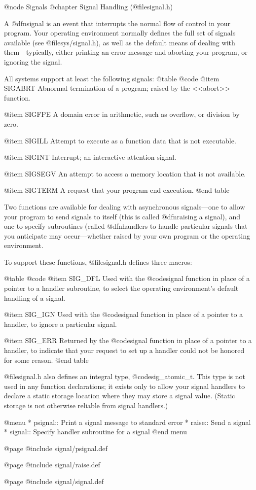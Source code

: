 @node Signals
@chapter Signal Handling (@file{signal.h})

A @dfn{signal} is an event that interrupts the normal flow of control
in your program.  Your operating environment normally defines the full
set of signals available (see @file{sys/signal.h}), as well as the
default means of dealing with them---typically, either printing an
error message and aborting your program, or ignoring the signal.

All systems support at least the following signals:
@table @code
@item SIGABRT
Abnormal termination of a program; raised by the <<abort>> function.

@item SIGFPE
A domain error in arithmetic, such as overflow, or division by zero.

@item SIGILL
Attempt to execute as a function data that is not executable.

@item SIGINT
Interrupt; an interactive attention signal.

@item SIGSEGV
An attempt to access a memory location that is not available.

@item SIGTERM
A request that your program end execution.
@end table

Two functions are available for dealing with asynchronous
signals---one to allow your program to send signals to itself (this is
called @dfn{raising} a signal), and one to specify subroutines (called
@dfn{handlers} to handle particular signals that you anticipate may
occur---whether raised by your own program or the operating environment.

To support these functions, @file{signal.h} defines three macros:

@table @code
@item SIG_DFL
Used with the @code{signal} function in place of a pointer to a
handler subroutine, to select the operating environment's default
handling of a signal.

@item SIG_IGN
Used with the @code{signal} function in place of a pointer to a
handler, to ignore a particular signal.

@item SIG_ERR
Returned by the @code{signal} function in place of a pointer to a
handler, to indicate that your request to set up a handler could not
be honored for some reason.
@end table

@file{signal.h} also defines an integral type, @code{sig_atomic_t}.
This type is not used in any function declarations; it exists only to
allow your signal handlers to declare a static storage location where
they may store a signal value.  (Static storage is not otherwise
reliable from signal handlers.)

@menu
* psignal:: Print a signal message to standard error
* raise::   Send a signal
* signal::  Specify handler subroutine for a signal
@end menu

@page
@include signal/psignal.def

@page
@include signal/raise.def

@page
@include signal/signal.def
